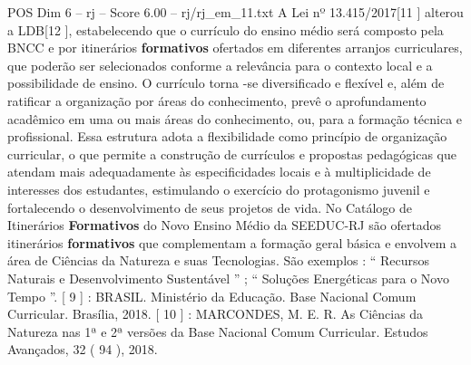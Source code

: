 \begin{textsample}{POS Dim 6 – rj – Score 6.00 – rj/rj\_em\_11.txt}
A Lei nº 13.415/2017[11 ] alterou a LDB[12 ], estabelecendo que o currículo do ensino médio será composto pela BNCC e por itinerários \textbf{formativos} ofertados em diferentes arranjos curriculares, que poderão ser selecionados conforme a relevância para o contexto local e a possibilidade de ensino.
O currículo torna -se diversificado e flexível e, além de ratificar a organização por áreas do conhecimento, prevê o aprofundamento acadêmico em uma ou mais áreas do conhecimento, ou, para a formação técnica e profissional.
Essa estrutura adota a flexibilidade como princípio de organização curricular, o que permite a construção de currículos e propostas pedagógicas que atendam mais adequadamente às especificidades locais e à multiplicidade de interesses dos estudantes, estimulando o exercício do protagonismo juvenil e fortalecendo o desenvolvimento de seus projetos de vida.
No Catálogo de Itinerários \textbf{Formativos} do Novo Ensino Médio da SEEDUC-RJ são ofertados itinerários \textbf{formativos} que complementam a formação geral básica e envolvem a área de Ciências da Natureza e suas Tecnologias.
São exemplos : “ Recursos Naturais e Desenvolvimento Sustentável ” ; “ Soluções Energéticas para o Novo Tempo ”. [ 9 ] : BRASIL.
Ministério da Educação.
Base Nacional Comum Curricular.
Brasília, 2018. [ 10 ] : MARCONDES, M.
E.
R.
As Ciências da Natureza nas 1ª e 2ª versões da Base Nacional Comum Curricular.
Estudos Avançados, 32 ( 94 ), 2018.

\end{textsample}
